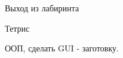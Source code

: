 \documentclass{article}
\begin{document}
\begin{center} Выход из лабиринта \end{center}

\newpage

\begin{center} Тетрис \end{center}
ООП, сделать GUI - заготовку.
\newpage

\end{document}
